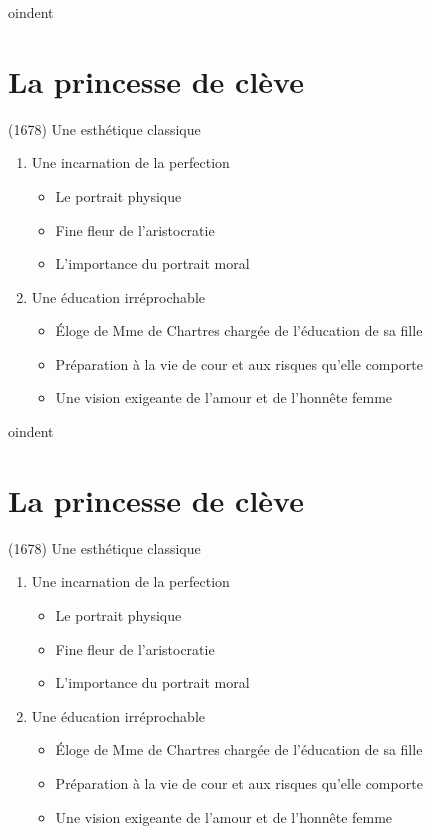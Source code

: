 \documentclass[12pt,a4paper]{article}
\begin{document}
oindent\hrulefill

\section*{La princesse de clève}
	(1678) Une esthétique classique
\begin{enumerate}
   \item Une incarnation de la perfection
   \begin{itemize}
     \item Le portrait physique
     \item Fine fleur de l'aristocratie
     \item L'importance du portrait moral
   \end{itemize}
   \item Une éducation irréprochable
   \begin{itemize}
       \item Éloge de Mme de Chartres chargée de l'éducation de sa fille
       \item Préparation à la vie de cour et aux risques qu'elle comporte
       \item Une vision exigeante de l'amour et de l'honnête femme
    \end{itemize}
\end{enumerate}

oindent\hrulefill

\section*{La princesse de clève}
	(1678) Une esthétique classique
\begin{enumerate}
   \item Une incarnation de la perfection
   \begin{itemize}
     \item Le portrait physique
     \item Fine fleur de l'aristocratie
     \item L'importance du portrait moral
   \end{itemize}
   \item Une éducation irréprochable
   \begin{itemize}
       \item Éloge de Mme de Chartres chargée de l'éducation de sa fille
       \item Préparation à la vie de cour et aux risques qu'elle comporte
       \item Une vision exigeante de l'amour et de l'honnête femme
    \end{itemize}
\end{enumerate}
\end{document}
